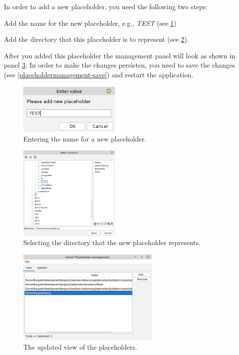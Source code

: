 \clearpage
{}
In order to add a new placeholder, you need the following two steps:
\begin{tight_enumerate}
	\item Add the name for the new placeholder, e.g., \textit{TEST} 
	(see \ref{placeholdermanagement-add1})
	\item Add the directory that this placeholder is to represent 
	(see \ref{placeholdermanagement-add2}).
\end{tight_enumerate}
After you added this placeholder the management panel will look as shown in panel \ref{placeholdermanagement-add3}.
In order to make the changes persisten, you need to save the changes (see 
\ref{placeholdermanagement-save}) and restart the application.

\begin{figure}[htb]
  \centering
  \includegraphics[width=5.0cm]{images/placeholdermanagement-add1.png}
  \caption{Entering the name for a new placeholder.}
  \label{placeholdermanagement-add1}
\end{figure}

\begin{figure}[htb]
  \centering
  \includegraphics[width=5.0cm]{images/placeholdermanagement-add2.png}
  \caption{Selecting the directory that the new placeholder represents.}
  \label{placeholdermanagement-add2}
\end{figure}

\begin{figure}[htb]
  \centering
  \includegraphics[width=7.0cm]{images/placeholdermanagement-add3.png}
  \caption{The updated view of the placeholders.}
  \label{placeholdermanagement-add3}
\end{figure}

